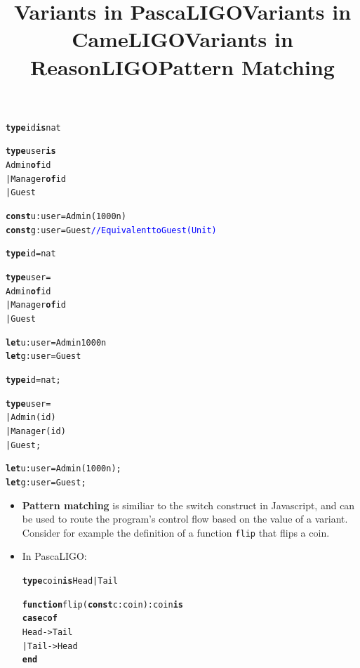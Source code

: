 \documentclass[wide]{slides}
\newcommand{\Kcase}[0]{\textbf{case}\xspace}
\newcommand{\Kconst}[0]{\textbf{const}\xspace}
\newcommand{\Kend}[0]{\textbf{end}\xspace}
\newcommand{\Kfunction}[0]{\textbf{function}\xspace}
\newcommand{\Kis}[0]{\textbf{is}\xspace}
\newcommand{\Kof}[0]{\textbf{of}\xspace}
\newcommand{\Ktype}[0]{\textbf{type}\xspace}
\newcommand{\Klet}[0]{\textbf{let}\xspace}
\newcommand{\com}[1]{\textcolor{blue}{{#1}}}
\begin{document}
\begin{slide}
  \title{Variants in PascaLIGO}

\begin{alltt}
\Ktype id \Kis nat

\Ktype user \Kis
  Admin   \Kof id
| Manager \Kof id
| Guest

\Kconst u : user = Admin (1000n)
\Kconst g : user = Guest         \com{// Equivalent to Guest (Unit)}
\end{alltt}

\end{slide}

\begin{slide}
  \title{Variants in CameLIGO}

\begin{alltt}
\Ktype id = nat

\Ktype user =
  Admin   \Kof id
| Manager \Kof id
| Guest

\Klet u : user = Admin 1000n
\Klet g : user = Guest
\end{alltt}

\end{slide}

\begin{slide}
  \title{Variants in ReasonLIGO}

\begin{alltt}
\Ktype id = nat;

\Ktype user =
| Admin   (id)
| Manager (id)
| Guest;

\Klet u : user = Admin (1000n);
\Klet g : user = Guest;
\end{alltt}

\end{slide}

\begin{slide}
  \title{Pattern Matching}

  \begin{itemize}

    \item \textbf{Pattern matching} is similiar to the switch
      construct in Javascript, and can be used to route the program's
      control flow based on the value of a variant. Consider for
      example the definition of a function \texttt{flip} that flips a
      coin.

    \item In PascaLIGO:
      \begin{alltt}
\Ktype coin \Kis Head | Tail

\Kfunction flip (\Kconst c : coin) : coin \Kis
  \Kcase c \Kof
    Head -> Tail
  | Tail -> Head
  \Kend
      \end{alltt}

  \end{itemize}

\end{slide}
\end{document}
